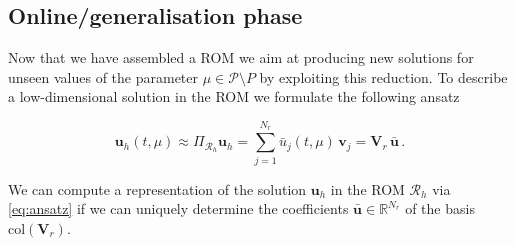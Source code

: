 \documentclass[../main.tex]{subfiles}
\begin{document}
\subsection{Online/generalisation phase}\label{subsec:online}
Now that we have assembled a ROM we aim at producing new solutions for unseen values of the parameter $\mu\in \mathcal{P}\setminus P$ by exploiting this reduction.
To describe a low-dimensional solution in the ROM we formulate the following ansatz

\begin{equation}\label{eq:ansatz}
        \boldsymbol{u}_{h}(t,\mu)\approx\Pi_{\mathcal{R}_{h}}\boldsymbol{u}_{h} = \sum_{j=1}^{N_{r}}\bar{u}_{j}(t,\mu)\,\boldsymbol{v}_{j} = \boldsymbol{V}_{r}\,\bar{\boldsymbol{u}}\,.
\end{equation}

We can compute a representation of the solution $\boldsymbol{u}_{h}$ in the ROM $\mathcal{R}_{h}$ via \eqref{eq:ansatz} if we can uniquely determine the coefficients $\bar{\boldsymbol{u}}\in \mathbb{R}^{N_{r}}$ of the basis $\text{col}(\boldsymbol{V}_{r})$.



\end{document}
